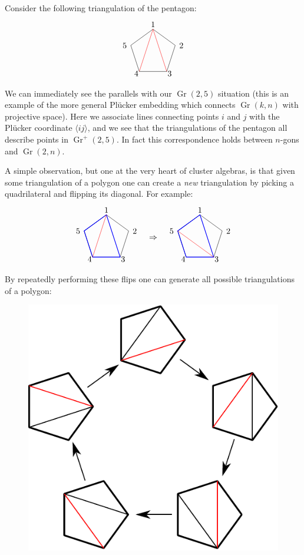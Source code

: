 \documentclass[11pt]{article}
\DeclareMathOperator{\Gr}{Gr}
\def\ket#1{\langle #1 \rangle}
\def\drawLabeledPentagon{
\coordinate (P1) at (90:1);
\coordinate (P2) at (18:1);
\coordinate (P3) at (306:1);
\coordinate (P4) at (234:1);
\coordinate (P5) at (162:1);
\draw (P1) -- (P2) -- (P3) -- (P4) -- (P5) -- cycle;
\draw (0,1.2) node {1};
\draw (1,.3) node[anchor=west] {2};
\draw (.5,-.9) node[anchor=west] {3};
\draw (-.5,-.9) node[anchor=east] {4};
\draw (-1,.3) node[anchor=east] {5};
}
\begin{document}
Consider the following triangulation of the pentagon:
\begin{equation}
\begin{tikzpicture}
  \drawLabeledPentagon
  \draw[color=red] (P1) -- (P3);
  \draw[color=red] (P1) -- (P4);
\end{tikzpicture}
\end{equation}
We can immediately see the parallels with our $\Gr(2,5)$ situation (this is an example of the more general Pl\"ucker embedding which connects $\Gr(k,n)$ with projective space). Here we associate lines connecting points $i$ and $j$ with the Pl\"ucker coordinate $\ket{ij}$, and we see that the triangulations of the pentagon all describe points in $\Gr^+(2,5)$. In fact this correspondence holds between $n$-gons and $\Gr(2,n)$. 

A simple observation, but one at the very heart of cluster algebras, is that given some triangulation of a polygon one can create a \emph{new} triangulation by picking a quadrilateral and flipping its diagonal. For example:
\begin{equation}
\begin{tikzpicture}
  \drawLabeledPentagon
  \draw[color=blue, thick] (P1) -- (P3) -- (P4) -- (P5) -- cycle;
  \draw[color=red] (P1) -- (P4);
  \draw (2,0) node {$\Rightarrow$};
\begin{scope}[xshift = 4cm]
  \drawLabeledPentagon
  \draw[color=blue, thick] (P1) -- (P3) -- (P4) -- (P5) -- cycle;
  \draw[color=red] (P5) -- (P3);
\end{scope}
\end{tikzpicture} 
\end{equation}
By repeatedly performing these flips one can generate all possible triangulations of a polygon:
\begin{figure}[h]
  \centering
  \includegraphics[scale=0.6]{pentagon-triangulations}
\end{figure}
\end{document}
